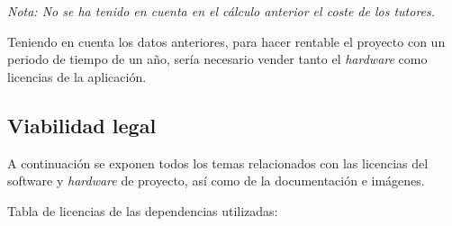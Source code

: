 \textit{Nota: No se ha tenido en cuenta en el cálculo anterior el coste de los tutores.}

Teniendo en cuenta los datos anteriores, para hacer rentable el proyecto con un periodo de tiempo de un año, sería necesario vender tanto el \emph{hardware} como licencias de la aplicación. 

\subsection{Viabilidad legal}

A continuación se exponen todos los temas relacionados con las licencias del software y \emph{hardware} de proyecto, así como de la documentación e imágenes.

Tabla de licencias de las dependencias utilizadas:

